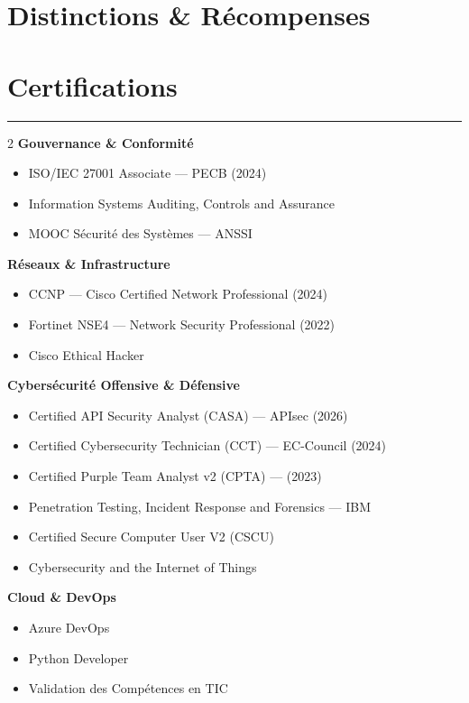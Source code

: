 \section{Distinctions \& Récompenses}
\begin{cvhonors}
\end{cvhonors}

\section{Certifications}
{\color{blue} \rule{\linewidth}{1mm}}
\vspace{-3mm}
\begin{multicols}{2}
\textbf{Gouvernance \& Conformité}
\begin{itemize}
  \item ISO/IEC 27001 Associate — PECB (2024)
  \item Information Systems Auditing, Controls and Assurance
  \item MOOC Sécurité des Systèmes — ANSSI
\end{itemize}

\medskip
\textbf{Réseaux \& Infrastructure}
\begin{itemize}
  \item CCNP — Cisco Certified Network Professional (2024)
  \item Fortinet NSE4 — Network Security Professional (2022)
  \item Cisco Ethical Hacker
\end{itemize}

\columnbreak

\textbf{Cybersécurité Offensive \& Défensive}
\begin{itemize}
  \item Certified API Security Analyst (CASA) — APIsec (2026)
  \item Certified Cybersecurity Technician (CCT) — EC-Council (2024)
  \item Certified Purple Team Analyst v2 (CPTA) — (2023)
  \item Penetration Testing, Incident Response and Forensics — IBM
  \item Certified Secure Computer User V2 (CSCU)
  \item Cybersecurity and the Internet of Things
\end{itemize}

\medskip
\textbf{Cloud \& DevOps}
\begin{itemize}
  \item Azure DevOps
  \item Python Developer
  \item Validation des Compétences en TIC
\end{itemize}

\end{multicols}
